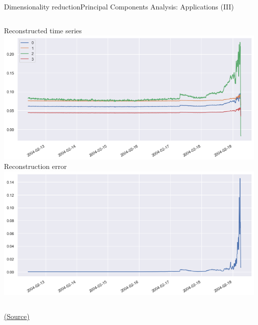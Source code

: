 \documentclass[10pt,compress]{beamer} %
\begin{document}
\begin{frame}{Dimensionality reduction}{Principal Components Analysis: Applications (III)}
    \begin{columns}
            \centering Reconstructed time series
			\includegraphics[width=\linewidth]{figs/bearings2.png}
            \centering Reconstruction error
			\includegraphics[width=\linewidth]{figs/bearingerror.png}
    \end{columns}

   	\centering \tiny{\href{https://www.atmosera.com/blog/pca-based-anomaly-detection/}{(Source)}}
\end{frame}


\end{document}
